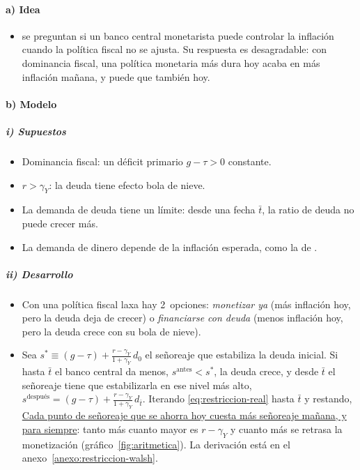 \documentclass[11pt]{article}
\begin{document}
\paragraph{a) Idea}

\begin{itemize}
\item \textcite{SargentWallace1981Some} se preguntan si un banco central monetarista puede controlar la inflación cuando la política fiscal no se ajusta. Su respuesta es desagradable: con dominancia fiscal, una política monetaria más dura hoy acaba en más inflación mañana, y puede que también hoy.
\end{itemize}

\paragraph{b) Modelo}

\subparagraph{i) Supuestos}

\begin{itemize}
\item Dominancia fiscal: un déficit primario $g-\tau>0$ constante.
\item $r>\gamma_Y$: la deuda tiene efecto bola de nieve.
\item La demanda de deuda tiene un límite: desde una fecha $\bar t$, la ratio de deuda no puede crecer más.
\item La demanda de dinero depende de la inflación esperada, como la de .
\end{itemize}

\subparagraph{ii) Desarrollo}

\begin{itemize}
\item Con una política fiscal laxa hay 2~opciones: \emph{monetizar ya} (más inflación hoy, pero la deuda deja de crecer) o \emph{financiarse con deuda} (menos inflación hoy, pero la deuda crece con su bola de nieve).
\item Sea $s^*\equiv(g-\tau)+\frac{r-\gamma_Y}{1+\gamma_Y}\,d_0$ el señoreaje que estabiliza la deuda inicial. Si hasta $\bar t$ el banco central da menos, $s^{\text{antes}}<s^*$, la deuda crece, y desde $\bar t$ el señoreaje tiene que estabilizarla en ese nivel más alto, $s^{\text{después}}=(g-\tau)+\frac{r-\gamma_Y}{1+\gamma_Y}\,d_{\bar t}$. Iterando \eqref{eq:restriccion-real} hasta $\bar t$ y restando,
  \uline{Cada punto de señoreaje que se ahorra hoy cuesta más señoreaje mañana, y para siempre}: tanto más cuanto mayor es $r-\gamma_Y$ y cuanto más se retrasa la monetización (gráfico~\ref{fig:aritmetica}). La derivación está en el anexo~\ref{anexo:restriccion-walsh}.
\end{itemize}
\end{document}
